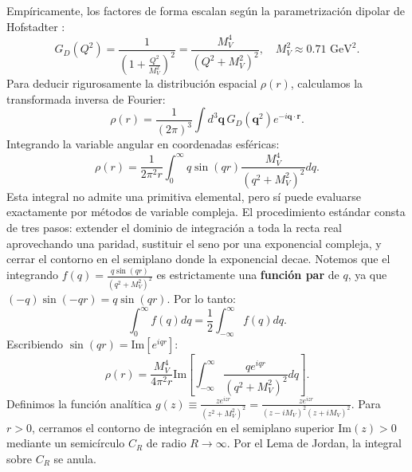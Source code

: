 \documentclass[10pt,a4paper]{article}
\begin{document}
Empíricamente, los factores de forma escalan según la parametrización dipolar de Hofstadter \cite{hofstadter1956}:
\begin{equation}
G_D(Q^2) = \frac{1}{\left( 1 + \frac{Q^2}{M_V^2} \right)^2} = \frac{M_V^4}{(Q^2 + M_V^2)^2}, \quad M_V^2 \approx 0.71\text{ GeV}^2.
\end{equation}
Para deducir rigurosamente la distribución espacial $\rho(r)$, calculamos la transformada inversa de Fourier:
\begin{equation}
\rho(r) = \frac{1}{(2\pi)^3} \int d^3\mathbf{q} \, G_D(\mathbf{q}^2) e^{-i \mathbf{q} \cdot \mathbf{r}}.
\end{equation}
Integrando la variable angular en coordenadas esféricas:
\begin{equation}
\rho(r) = \frac{1}{2\pi^2 r} \int_0^\infty q \sin(qr) \frac{M_V^4}{(q^2 + M_V^2)^2} dq.
\end{equation}
Esta integral no admite una primitiva elemental, pero sí puede evaluarse exactamente por métodos de variable compleja. El procedimiento estándar consta de tres pasos: extender el dominio de integración a toda la recta real aprovechando una paridad, sustituir el seno por una exponencial compleja, y cerrar el contorno en el semiplano donde la exponencial decae. Notemos que el integrando $f(q) = \frac{q \sin(qr)}{(q^2 + M_V^2)^2}$ es estrictamente una \textbf{función par} de $q$, ya que $(-q)\sin(-qr) = q\sin(qr)$. Por lo tanto:
\begin{equation}
\int_0^\infty f(q) dq = \frac{1}{2} \int_{-\infty}^\infty f(q) dq.
\end{equation}
Escribiendo $\sin(qr) = \text{Im}[e^{iqr}]$:
\begin{equation}
\rho(r) = \frac{M_V^4}{4\pi^2 r} \text{Im} \left[ \int_{-\infty}^\infty \frac{q e^{iqr}}{(q^2 + M_V^2)^2} dq \right].
\end{equation}
Definimos la función analítica $g(z) \equiv \frac{z e^{izr}}{(z^2 + M_V^2)^2} = \frac{z e^{izr}}{(z - iM_V)^2 (z + iM_V)^2}$. Para $r > 0$, cerramos el contorno de integración en el semiplano superior $\text{Im}(z) > 0$ mediante un semicírculo $C_R$ de radio $R \to \infty$. Por el Lema de Jordan, la integral sobre $C_R$ se anula.
\end{document}
